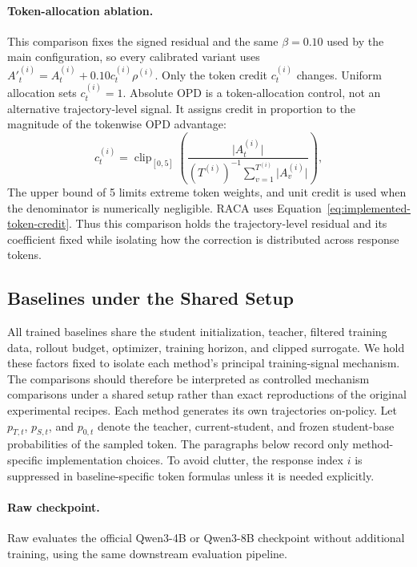 \paragraph{Token-allocation ablation.}
This comparison fixes the signed residual and the same $\beta=0.10$ used by
the main configuration, so every calibrated variant uses
$A'^{(i)}_t=A^{(i)}_t+0.10c^{(i)}_t\rho^{(i)}$. Only the token credit
$c^{(i)}_t$ changes. Uniform allocation sets
$c^{(i)}_t=1$. Absolute OPD is a token-allocation control, not an alternative
trajectory-level signal. It assigns credit in proportion to the magnitude of
the tokenwise OPD advantage:
\begin{equation}
c^{(i)}_t=\operatorname{clip}_{[0,5]}\!\left(
\frac{\lvert A^{(i)}_t\rvert}
{(T^{(i)})^{-1}\sum_{v=1}^{T^{(i)}}\lvert A^{(i)}_v\rvert}
\right),
\label{eq:absolute-opd-credit}
\end{equation}
The upper bound of 5 limits extreme token weights, and unit credit is used when
the denominator is numerically negligible. RACA uses
Equation~\ref{eq:implemented-token-credit}. Thus this comparison holds the
trajectory-level residual and its coefficient fixed while isolating how the
correction is distributed across response tokens.

\subsection{Baselines under the Shared Setup}

All trained baselines share the student initialization, teacher, filtered
training data, rollout budget, optimizer, training horizon, and clipped
surrogate. We hold these factors fixed to isolate each method's principal
training-signal mechanism. The comparisons should therefore be interpreted as
controlled mechanism comparisons under a shared setup rather than exact
reproductions of the original experimental recipes. Each method generates its
own trajectories on-policy. Let
$p_{T,t}$, $p_{S,t}$, and $p_{0,t}$ denote the teacher, current-student, and
frozen student-base probabilities of the sampled token. The paragraphs below
record only method-specific implementation choices. To avoid clutter, the
response index $i$ is suppressed in baseline-specific token formulas unless
it is needed explicitly.

\paragraph{Raw checkpoint.}
Raw evaluates the official Qwen3-4B or Qwen3-8B checkpoint without additional
training, using the same downstream evaluation pipeline.

